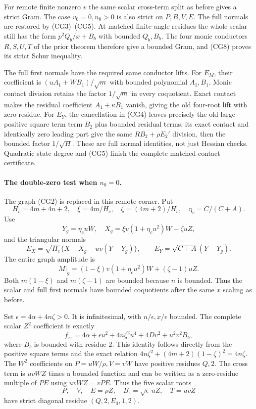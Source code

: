 For remote finite nonzero $v$ the same scalar cross-term split as
before gives a strict Gram.  The case $v_0=0,n_0>0$ is also strict
on $P,B,V,E$.  The full normals are restored by (CG3)--(CG5).
At matched finite-angle residues the whole scalar still has the
form $p^2Q_b/x+B_b$ with bounded $Q_b,B_b$.  The four monic
conductors $R,S,U,T$ of the prior theorem therefore give a bounded
Gram, and (CG8) proves its strict Schur inequality.

The full first normals have the required same conductor lifts.
For $E_M$, their coefficient is $(uA_1+WB_1)/\sqrt m$ with bounded
polynomial $A_1,B_1$.  Monic contact division retains the factor
$1/\sqrt m$ in every coquotient.  Exact contact makes the residual
coefficient $A_1+\kappa B_1$ vanish, giving the old four-root lift
with zero residue.  For $E_Y$, the cancellation in (CG4) leaves
precisely the old large-positive square term term $B_2$ plus bounded residual
terms; its exact contact and identically zero leading part give
the same $R B_2+\rho E_2'$ division, then the bounded factor
$1/\sqrt H$.  These are full normal identities, not just Hessian
checks.  Quadratic state degree and (CG5) finish the complete
matched-contact certificate.

\paragraph{The double-zero test when $n_0=0$.}
The graph (CG2) is replaced in this remote corner.  Put
\[
 H_c=4m+4n+2,\quad \xi=4m/H_c,\quad
 \zeta=(4m+2)/H_c,\quad \eta_c=C/(C+A).
\]
Use
\[
 Y_g=\eta_cuW,\quad
 X_g=\xi v(1+\eta_cu^2)W-\zeta uZ,
\]
and the triangular normals
\[
 E_X=\sqrt{H_c}\{X-X_g-uv(Y-Y_g)\},\qquad
 E_Y=\sqrt{C+A}(Y-Y_g).                                \tag{CG9}
\]
The entire graph amplitude is
\[
 M|_g=(1-\xi)v(1+\eta_cu^2)W+(\zeta-1)uZ.
\]
Both $m(1-\xi)$ and $m(\zeta-1)$ are bounded because $n$ is
bounded.  Thus the scalar and full first normals have bounded
coquotients after the same $x$ scaling as before.

Set $\epsilon=4\alpha+4n\zeta>0$.  It is infinitesimal, with
$n/\epsilon,x/\epsilon$ bounded.  The complete scalar $Z^2$
coefficient is exactly
\[
 f_{zz}=4\alpha+\epsilon u^2+4n\zeta^2u^4+4Dv^2
                            +u^2v^2 B_b,               \tag{CG10}
\]
where $B_b$ is bounded with residue $2$.  This identity follows
directly from the positive square terms and the exact relation
$4n\zeta^2+(4m+2)(1-\zeta)^2=4n\zeta$.
The $W^2$ coefficients on $P=uW/\rho,V=vW$ have positive residues
$Q,2$.  The cross term is $uvWZ$ times a bounded function and
can be written as a zero-residue multiple of $PE$ using
$uvWZ=vPE$.  Thus the five scalar roots
\[
           P,\quad V,\quad E=\rho Z,\quad
           B_\epsilon=\sqrt\epsilon\,uZ,\quad T=uvZ
\]
have strict diagonal residue $(Q,2,E_0,1,2)$.

